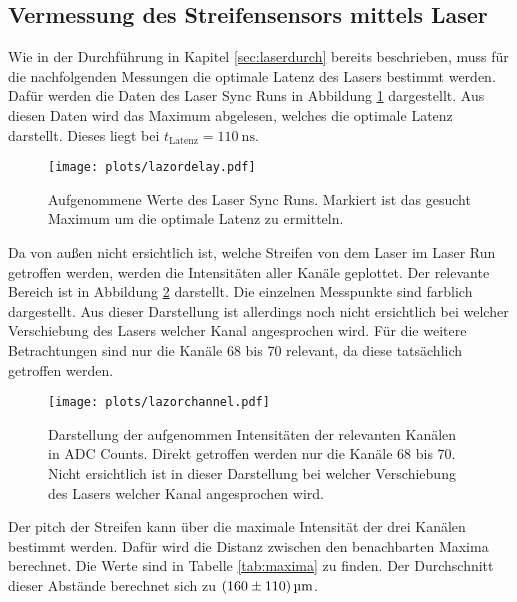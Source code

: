 \subsection{Vermessung des Streifensensors mittels Laser}

Wie in der Durchführung in Kapitel \ref{sec:laserdurch} bereits beschrieben, muss für die nachfolgenden Messungen die optimale Latenz des Lasers bestimmt werden.
Dafür werden die Daten des Laser Sync Runs in Abbildung \ref{fig:lazordelay} dargestellt.
Aus diesen Daten wird das Maximum abgelesen, welches die optimale Latenz darstellt.
Dieses liegt bei $t_\text{Latenz} = \SI{110}{\nano\second}$.

\begin{figure}[H]
  \centering
  \texttt{[image: plots/lazordelay.pdf]}
  \caption{Aufgenommene Werte des Laser Sync Runs. Markiert ist das gesucht Maximum um die optimale Latenz zu ermitteln.}
  \label{fig:lazordelay}
\end{figure}

Da von außen nicht ersichtlich ist, welche Streifen von dem Laser im Laser Run getroffen werden,
werden die Intensitäten aller Kanäle geplottet.
Der relevante Bereich ist in Abbildung \ref{fig:lazorchannel} darstellt.
Die einzelnen Messpunkte sind farblich dargestellt.
Aus dieser Darstellung ist allerdings noch nicht ersichtlich bei welcher Verschiebung des Lasers welcher Kanal angesprochen wird.
Für die weitere Betrachtungen sind nur die Kanäle 68 bis 70 relevant, da diese tatsächlich getroffen werden.

\begin{figure}
  \centering
  \texttt{[image: plots/lazorchannel.pdf]}
  \caption{Darstellung der aufgenommen Intensitäten der relevanten Kanälen in ADC Counts. Direkt getroffen werden nur die Kanäle 68 bis 70. Nicht ersichtlich ist in dieser Darstellung bei welcher Verschiebung des Lasers welcher Kanal angesprochen wird.}
  \label{fig:lazorchannel}
\end{figure}

Der pitch der Streifen kann über die maximale Intensität der drei Kanälen bestimmt werden.
Dafür wird die Distanz zwischen den benachbarten Maxima berechnet.
Die Werte sind in Tabelle \ref{tab:maxima} zu finden.
Der Durchschnitt dieser Abstände berechnet sich zu $\SI{160 \pm 110}{\micro\metre}$.

